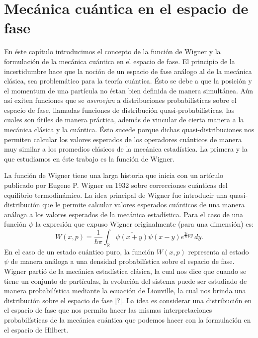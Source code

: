 \documentclass[a4paper]{report}
\DeclareMathOperator{\R}{\mathbb{R}}
\begin{document}
  \section{Mecánica cuántica en el espacio de fase}

  En éste capítulo introducimos el concepto de la función de
  Wigner y la formulación de la mecánica cuántica en el
  espacio de fase. El principio de la incertidumbre hace que
  la noción de un espacio de fase análogo al de la mecánica
  clásica, sea problemático para la teoría cuántica. Ésto se
  debe a que la posición y el momentum de una partícula no
  éstan bien definida de manera simultánea. Aún así exiten
  funciones que se \textit{asemejan} a distribuciones
  probabilísticas sobre el espacio de fase, llamadas
  funciones de distribución quasi-probabilísticas, las
  cuales son útiles de manera práctica, además de vincular
  de cierta manera a la mecánica clásica y la cuántica. Ésto
  sucede porque dichas quasi-distribuciones nos permiten
  calcular los valores esperados de los operadores cuánticos
  de manera muy similar a los promedios clásicos de la
  mecánica estadística. La primera y la que estudiamos en
  éste trabajo es la función de Wigner.

  La función de Wigner tiene una larga historia que inicia
  con un artículo publicado por Eugene P. Wigner en 1932
  \cite{wignerQuantumCorrectionThermodynamic1932} sobre
  correcciones cuánticas del equilibrio termodinámico. La
  idea principal de Wigner fue introducir una
  quasi-distribución que le permite calcular valores
  esperados cuánticos de una manera análoga a los valores
  esperados de la mecánica estadística. Para el caso de una
  función $\psi$ la expresión que expuso Wigner
  originalmente (para una dimensión) es:
  \begin{equation}
    \label{eqn:wigners_original}
    W(x,p)
    = \frac{1}{\hbar \pi} \int_{\R}
    \overline{\psi(x+y)}\psi(x-y) e^{\frac{2i}{\hbar}py} \,
    dy.
  \end{equation}
  En el caso de un estado cuántico puro, la función $W(x,p)$
  representa al estado $\psi$ de manera análoga a una
  densidad probabilística sobre el espacio de fase. Wigner
  partió de la mecánica estadística clásica, la cual nos
  dice que cuando se tiene un conjunto de partículas, la
  evolución del sistema puede ser estudiado de manera
  probabilística mediante la ecuación de Liouville, la cual
  nos brinda una distribución sobre el espacio de fase [?].
  La idea es considerar una distribución en el espacio de
  fase que nos permita hacer las mismas interpretaciones
  probabilísticas de la mecánica cuántica que podemos hacer
  con la formulación en el espacio de Hilbert.
\end{document}
